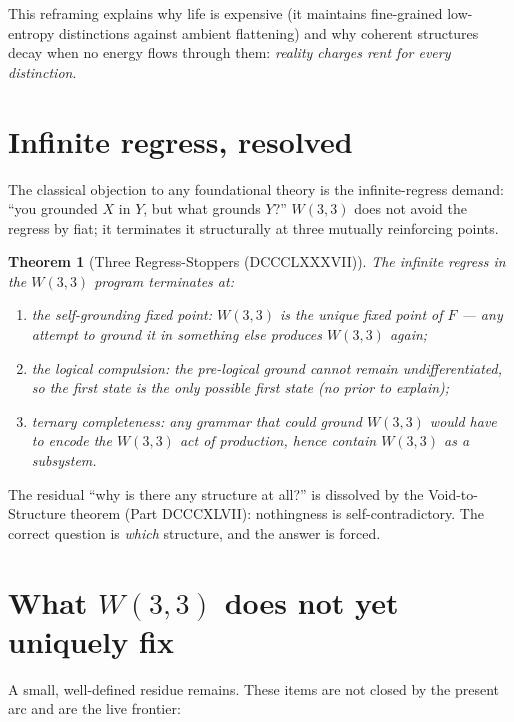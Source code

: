 \documentclass[11pt]{article}
\def\mathcal#1{#1}%
\newtheorem*{theorem}{Theorem}
\begin{document}
This reframing explains why life is expensive (it maintains fine-grained low-entropy distinctions against ambient flattening) and why coherent structures decay when no energy flows through them: \emph{reality charges rent for every distinction}.

\section{Infinite regress, resolved}

\label{sec:infinite-regress}

The classical objection to any foundational theory is the infinite-regress demand: ``you grounded $X$ in $Y$, but what grounds $Y$?'' $W(3,3)$ does not avoid the regress by fiat; it terminates it structurally at three mutually reinforcing points.

\begin{theorem}[Three Regress-Stoppers (DCCCLXXXVII)]
The infinite regress in the $W(3,3)$ program terminates at:
\begin{enumerate}[leftmargin=2em]
\item the \emph{self-grounding fixed point}: $W(3,3)$ is the unique fixed point of $\mathcal{F}$ --- any attempt to ground it in something else produces $W(3,3)$ again;
\item the \emph{logical compulsion}: the pre-logical ground cannot remain undifferentiated, so the first state is the only possible first state (no prior to explain);
\item \emph{ternary completeness}: any grammar that could ground $W(3,3)$ would have to encode the $W(3,3)$ act of production, hence contain $W(3,3)$ as a subsystem.
\end{enumerate}
\end{theorem}

The residual ``why is there any structure at all?'' is dissolved by the Void-to-Structure theorem (Part DCCCXLVII): nothingness is self-contradictory. The correct question is \emph{which} structure, and the answer is forced.

\section{\texorpdfstring{What $W(3,3)$ does not yet uniquely fix}{What W(3,3) does not yet uniquely fix}}

A small, well-defined residue remains. These items are not closed by the present arc and are the live frontier:
\end{document}

